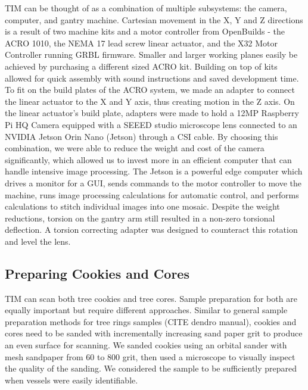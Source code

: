 \documentclass[a4paper,12pt]{article}
\begin{document}
TIM can be thought of as a combination of multiple subsystems: the camera, computer, and gantry machine. 
Cartesian movement in the X, Y and Z directions is a result of two machine kits and a motor controller from OpenBuilds - the ACRO 1010, the NEMA 17 lead screw linear actuator, and the X32 Motor Controller running GRBL firmware. 
Smaller and larger working planes easily be achieved by purchasing a different sized ACRO kit.
Building on top of kits allowed for quick assembly with sound instructions and saved development time. 
To fit on the build plates of the ACRO system, we made an adapter to connect the linear actuator to the X and Y axis, thus creating motion in the Z axis.
On the linear actuator's build plate, adapters were made to hold a 12MP Raspberry Pi HQ Camera equipped with a SEEED studio microscope lens connected to an NVIDIA Jetson Orin Nano (Jetson) through a CSI cable.
By choosing this combination, we were able to reduce the weight and cost of the camera significantly, which allowed us to invest more in an efficient computer that can handle intensive image processing. 
The Jetson is a powerful edge computer which drives a monitor for a GUI, sends commands to the motor controller to move the machine, runs image processing calculations for automatic control, and performs calculations to stitch individual images into one mosaic. 
Despite the weight reductions, torsion on the gantry arm still resulted in a non-zero torsional deflection. A torsion correcting adapter was designed to counteract this rotation and level the lens.


\subsection{Preparing Cookies and Cores}
TIM can scan both tree cookies and tree cores. Sample preparation for both are equally important but require different approaches.
Similar to general sample preparation methods for tree rings samples (CITE dendro manual), cookies and cores need to be sanded with incrementally increasing sand paper grit to produce an even surface for scanning. We sanded cookies using an orbital sander with mesh sandpaper from 60 to 800 grit, then used a microscope to visually inspect the quality of the sanding. We considered the sample to be sufficiently prepared when vessels were easily identifiable.
\end{document}
